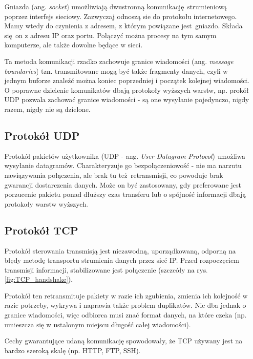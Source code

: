 Gniazda (ang. \textit{socket}) umożliwiają dwustronną komunikację strumieniową poprzez interfejs sieciowy. Zazwyczaj odnoszą sie do protokołu internetowego. Mamy wtedy do czynienia z adresem, z którym powiązane jest gniazdo. Składa się on z adresu IP oraz portu. Połączyć można procesy na tym samym komputerze, ale także dowolne będące w sieci. 

Ta metoda komunikacji rzadko zachowuje granice wiadomości (ang. \textit{message boundaries}) tzn. transmitowane mogą być także fragmenty danych, czyli w jednym buforze znaleźć można koniec poprzedniej i początek kolejnej wiadomości. O poprawne dzielenie komunikatów dbają protokoły wyższych warstw, np. prokół UDP pozwala zachować granice wiadomości - są one wysyłanie pojedynczo, nigdy razem, nigdy nie są dzielone.


\subsection{Protokół UDP}

Protokół pakietów użytkownika (UDP - ang. \textit{User Datagram Protocol}) umożliwa wysyłanie datagramów. Charakteryzuje go bezpołączeniowość - nie ma narzutu nawiązywania połączenia, ale brak tu też retransmisji, co powoduje brak gwarancji dostarczenia danych. Może on być zastosowany, gdy preferowane jest porzucenie pakietu ponad dłuższy czas transferu lub o spójność informacji dbają protokoły warstw wyższych.


\subsection{Protokół TCP}
\label{TCP}

Protokół sterowania transmisją jest niezawodną, uporządkowaną, odporną na błędy metodę transportu strumienia danych przez sieć IP. Przed rozpoczęciem transmisji informacji, stabilizowane jest połączenie (szczeóły na rys. \ref{fig:TCP_handshake}).

Protokół ten retransmituje pakiety w razie ich zgubienia, zmienia ich kolejność w razie potrzeby, wykrywa i naprawia także problem duplikatów. Nie dba jednak o granice wiadomości, więc odbiorca musi znać format danych, na które czeka (np. umieszcza się w ustalonym miejscu długość całej wiadomości).

Cechy gwarantujące udaną komunikację spowodowały, że TCP używany jest na bardzo szeroką skalę (np. HTTP, FTP, SSH).


